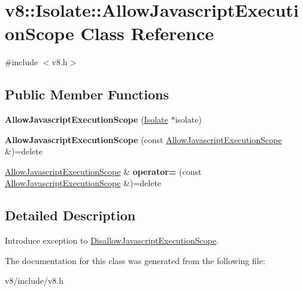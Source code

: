 \hypertarget{classv8_1_1Isolate_1_1AllowJavascriptExecutionScope}{}\section{v8\+:\+:Isolate\+:\+:Allow\+Javascript\+Execution\+Scope Class Reference}
\label{classv8_1_1Isolate_1_1AllowJavascriptExecutionScope}


{\ttfamily \#include $<$v8.\+h$>$}

\subsection*{Public Member Functions}
\begin{DoxyCompactItemize}
\item 
\mbox{\label{classv8_1_1Isolate_1_1AllowJavascriptExecutionScope_ac73a647c33756c6b7c3896170e069e8c}} 
{\bfseries Allow\+Javascript\+Execution\+Scope} (\mbox{\hyperlink{classv8_1_1Isolate}{Isolate}} $\ast$isolate)
\item 
\mbox{\label{classv8_1_1Isolate_1_1AllowJavascriptExecutionScope_a20bf639420617b08404e2bed1b203dbc}} 
{\bfseries Allow\+Javascript\+Execution\+Scope} (const \mbox{\hyperlink{classv8_1_1Isolate_1_1AllowJavascriptExecutionScope}{Allow\+Javascript\+Execution\+Scope}} \&)=delete
\item 
\mbox{\label{classv8_1_1Isolate_1_1AllowJavascriptExecutionScope_a436e3fc96e3796ccfd265a153d71224a}} 
\mbox{\hyperlink{classv8_1_1Isolate_1_1AllowJavascriptExecutionScope}{Allow\+Javascript\+Execution\+Scope}} \& {\bfseries operator=} (const \mbox{\hyperlink{classv8_1_1Isolate_1_1AllowJavascriptExecutionScope}{Allow\+Javascript\+Execution\+Scope}} \&)=delete
\end{DoxyCompactItemize}


\subsection{Detailed Description}
Introduce exception to \mbox{\hyperlink{classv8_1_1Isolate_1_1DisallowJavascriptExecutionScope}{Disallow\+Javascript\+Execution\+Scope}}. 

The documentation for this class was generated from the following file\+:\begin{DoxyCompactItemize}
\item 
v8/include/v8.\+h\end{DoxyCompactItemize}
